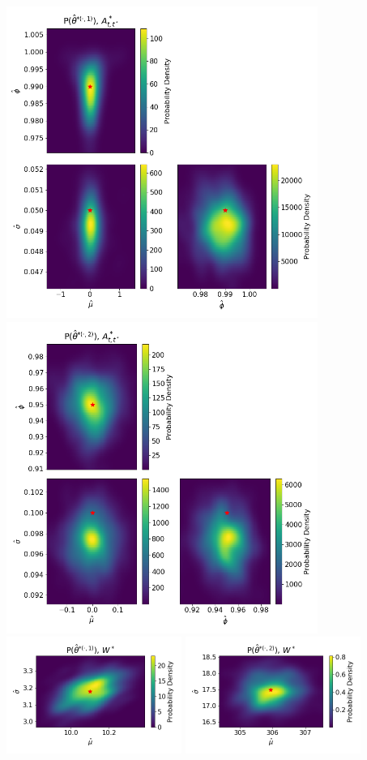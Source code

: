 \documentclass[12pt]{TD-CJS}
\begin{document}
\includegraphics[height=4in]{../Plots/hhmm_FV_MLE_density_A_0_0.png}
\includegraphics[height=4in]{../Plots/hhmm_FV_MLE_density_A_0_1.png}
\includegraphics[width=2.25in]{../Plots/hhmm_FV_MLE_density_FoVeDBA_0_0.png}
\includegraphics[width=2.25in]{../Plots/hhmm_FV_MLE_density_FoVeDBA_0_1.png}
\end{document}
